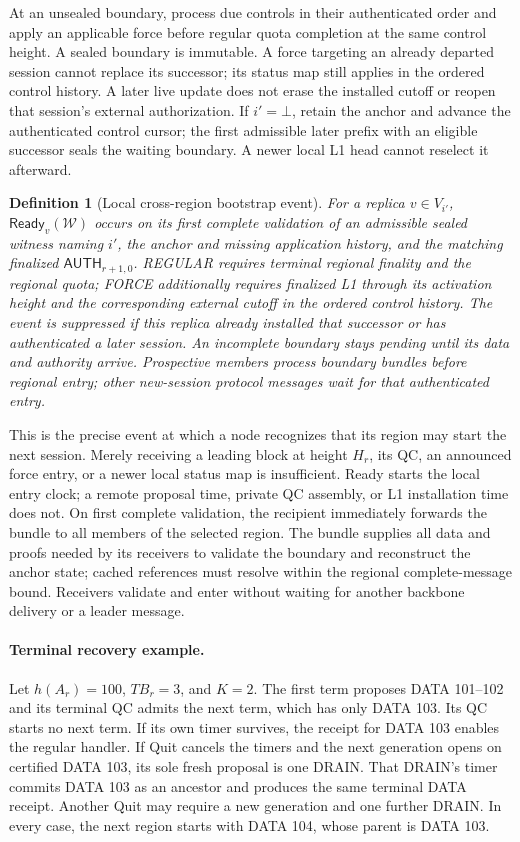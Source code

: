 \documentclass[11pt,a4paper]{article}
\newcommand{\tagg}[1]{\ensuremath{\mathsf{#1}}}
\newtheorem{definition}{Definition}[section]
\newcounter{protocol}
\begin{document}
At an unsealed boundary, process due controls in their authenticated
order and apply an applicable force before regular quota completion at
the same control height. A sealed boundary is immutable. A force targeting
an already departed session cannot replace its successor; its status map
still applies in the ordered control history. A later live update does
not erase the installed cutoff or reopen that session's external
authorization.
If $i'=\bot$, retain the anchor and advance the authenticated control
cursor; the first admissible later prefix with an eligible successor seals
the waiting boundary. A newer local L1 head cannot reselect it afterward.

\begin{definition}[Local cross-region bootstrap event]
\label{def:bootstrap}
For a replica $v\in V_{i'}$, $\tagg{Ready}_v(\mathcal W)$ occurs on its
first complete validation of an admissible sealed witness naming $i'$,
the anchor and missing application history, and the matching finalized
$\tagg{AUTH}_{r+1,0}$. REGULAR requires terminal regional finality and the regional
quota; FORCE additionally requires finalized L1 through its activation
height and the corresponding external cutoff in the ordered control history. The event is suppressed if this replica
already installed that successor or has authenticated a later session.
An incomplete boundary stays pending until its data and authority arrive.
Prospective members process boundary bundles before regional entry;
other new-session protocol messages wait for that authenticated entry.
\end{definition}
This is the precise event at which a node recognizes that its region may
start the next session. Merely receiving a leading block at height $H_r$,
its QC, an announced force entry, or a newer local status map is insufficient.
Ready starts the local entry clock; a remote proposal time, private QC
assembly, or L1 installation time does not.
On first complete validation, the recipient immediately forwards the
bundle to all members of the selected region. The bundle supplies all
data and proofs needed by its receivers to validate the boundary and
reconstruct the anchor state; cached references must resolve within the
regional complete-message bound. Receivers validate and enter without
waiting for another backbone delivery or a leader message.

\paragraph{Terminal recovery example.}
Let $h(A_r)=100$, $TB_r=3$, and $K=2$. The first term proposes DATA
101--102 and its terminal QC admits the next term, which has only DATA
103. Its QC starts no next term. If its own timer survives, the receipt
for DATA 103 enables the regular handler. If Quit cancels the timers and
the next generation opens on certified DATA 103, its sole fresh proposal
is one DRAIN. That DRAIN's timer commits DATA 103 as an ancestor and
produces the same terminal DATA receipt. Another Quit may require a new
generation and one further DRAIN. In every case, the next region starts
with DATA 104, whose parent is DATA 103.
\end{document}
